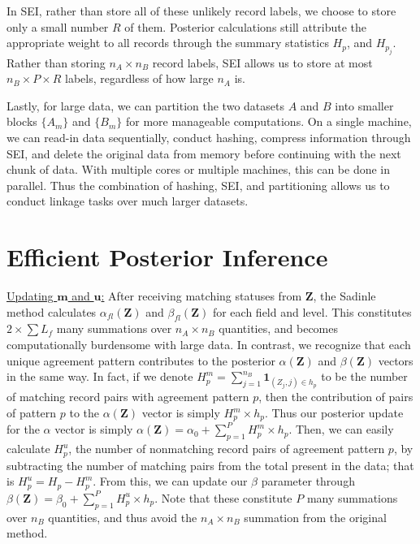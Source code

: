 \documentclass[12pt,letterpaper]{article}
\newcommand{\1}[1]{\mathbb{I}\!\left[#1\right]} %
\begin{document}
In SEI, rather than store all of these unlikely record labels, we choose
to store only a small number \(R\) of them. Posterior calculations still
attribute the appropriate weight to all records through the summary
statistics \(H_p\), and \(H_{p_j}\). Rather than storing
\(n_A \times n_B\) record labels, SEI allows us to store at most
\(n_B \times P \times R\) labels, regardless of how large \(n_A\) is.

Lastly, for large data, we can partition the two datasets \(A\) and
\(B\) into smaller blocks \(\{A_m\}\) and \(\{B_m\}\) for more
manageable computations. On a single machine, we can read-in data
sequentially, conduct hashing, compress information through SEI, and
delete the original data from memory before continuing with the next
chunk of data. With multiple cores or multiple machines, this can be
done in parallel. Thus the combination of hashing, SEI, and partitioning
allows us to conduct linkage tasks over much larger datasets.


\section{Efficient Posterior Inference}\label{sec:efficient-posterior}

\underline{Updating $\mathbf{m}$ and $\mathbf{u}$:} After receiving
matching statuses from \(\mathbf{Z}\), the Sadinle method calculates
\(\alpha_{fl}(\mathbf{Z})\) and \(\beta_{fl}(\mathbf{Z})\) for each
field and level. This constitutes \(2 \times \sum L_f\) many summations
over \(n_A \times n_B\) quantities, and becomes computationally
burdensome with large data. In contrast, we recognize that each unique
agreement pattern contributes to the posterior \(\alpha(\mathbf{Z})\)
and \(\beta(\mathbf{Z})\) vectors in the same way. In fact, if we denote
\(H_p^m = \sum_{j=1}^{n_B} \mathbf{1}_{(Z_j, j) \in h_p}\) to be the
number of matching record pairs with agreement pattern \(p\), then the
contribution of pairs of pattern \(p\) to the \(\alpha(\mathbf{Z})\)
vector is simply \(H_p^m \times h_p\). Thus our posterior update for the
\(\alpha\) vector is simply
\(\alpha(\mathbf{Z}) = \alpha_0 + \sum_{p=1}^P H_p^m \times h_p\). Then,
we can easily calculate \(H_p^u\), the number of nonmatching record
pairs of agreement pattern \(p\), by subtracting the number of matching
pairs from the total present in the data; that is
\(H_p^u = H_p - H_p^m\). From this, we can update our \(\beta\)
parameter through
\(\beta(\mathbf{Z}) = \beta_0 + \sum_{p=1}^P H_p^u \times h_p\). Note
that these constitute \(P\) many summations over \(n_B\) quantities, and
thus avoid the \(n_A \times n_B\) summation from the original method.
\end{document}
